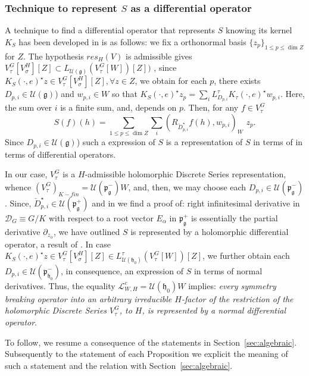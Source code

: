 \documentclass[12pt]{amsart}
\theoremstyle{definition}
\theoremstyle{remark}
\newcommand{\g}{\mathfrak{g}}
\newcommand{\h}{\mathfrak{h}}
\newcommand{\p}{\mathfrak p}
\numberwithin{equation}{section}
\begin{document}
  \subsubsection{Technique to represent $S$ as a differential operator}\label{sub:tech} A technique to find a differential operator that represents $S$ knowing its kernel $K_S$ has been developed in \cite{OV3}\cite{OV4} is as follows: we fix a orthonormal basis $\{z_p \}_{1\leq p \leq\dim  Z}$ for $Z$. The hypothesis $res_H(V)$ is admissible gives  $V_\tau^G[V_\sigma^H][Z] \subset L_ {\mathcal U(\mathfrak g)}(V_\tau^G[W])[Z])$ \cite[Prop. 1.6]{Kobdd3}, since  $K_S(\cdot,e)^\star z \in V_\tau^G[V_\sigma^H][Z], \forall z \in Z$, we obtain for     each  $p$, there exists   $D_{p,i}\in \mathcal U(\mathfrak g)$) and $w_{p,i} \in W$ so that $K_S(\cdot,e)^\star z_p=\sum_i L_{D_{p,i}}^\tau K_\tau(\cdot,e)^\star w_{p,i}$. Here, the sum over $i$ is a finite sum, and, depends on $p$. Then,  for any $f \in V_\tau^G$    \begin{equation}\label{eq:sasdfo} S(f)(h)= \sum_{1\leq p \leq  \dim  Z} \sum_i ( R_{\check D_{p,i}^\star}f(h),w_{p,i})_W \,\, z_p. \end{equation} Since  $D_{p,i} \in \mathcal U(\mathfrak g)$)  such a expression of $S $ is a representation of $S$ in terms of  in terms of differential operators.

In our case, $V_\tau^G$ is a $H$-admissible holomorphic Discrete Series representation, whence $(V_\tau^G)_{K-fin}= \mathcal U(\p_\g^-)W$, and, then, we may choose  each $D_{p,i} \in \mathcal U(\p_\g^-) $.  Since, $\check D_{p,i}^\star \in \mathcal U(\p_\g^+)$  and in \cite[IX,\S 5]{L} we find a proof of: right infinitesimal derivative in $\mathcal D_G \equiv G/K$ with respect to a root vector $E_\alpha$ in $\p_\g^+$ is essentially the partial derivative $\partial_{z_\alpha}$, we have outlined $S$ is represented by a holomorphic differential operator, a result of \cite{KP1}. In case $K_S(\cdot,e)^\star z \in V_\tau^G[V_\sigma^H][Z]  \in      L_ {\mathcal U(\mathfrak h_0)}^\tau(V_\tau^G[W])[Z]$, we further obtain each $D_{p,i} \in \mathcal U(\mathfrak p_{\h_0}^-)$, in consequence,  an expression of $S $   in terms of normal derivatives. Thus,  the equality $\mathcal L_{W,H}^c = \mathcal U(\mathfrak h_0)W$ implies: {\it every symmetry breaking operator into an arbitrary irreducible  $H$-factor of the restriction   of the holomorphic Discrete Series $V_\tau^G$, to $H$, is represented by a normal differential operator}.

To follow, we resume a consequence of the statements in Section~\ref{sec:algebraic}. Subsequently to  the statement of each Proposition we explicit the meaning of such a statement  and the relation with Section~\ref{sec:algebraic}.
\end{document}
